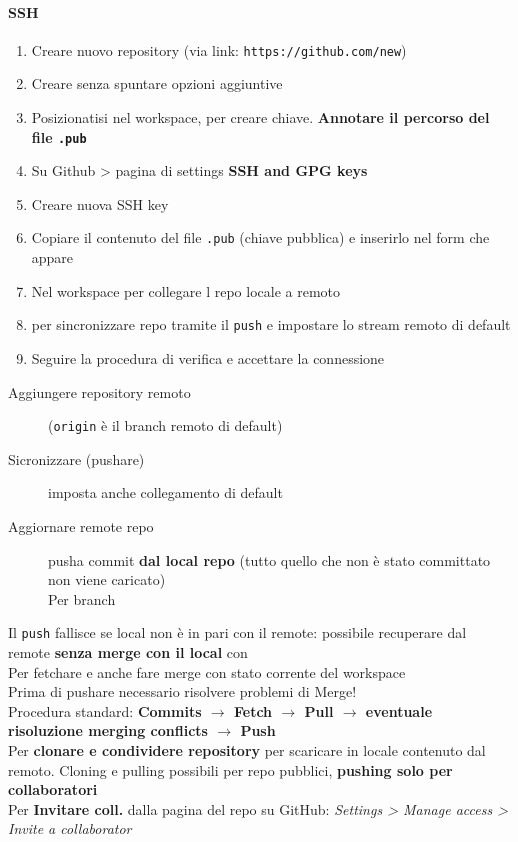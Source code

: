 \documentclass[10pt, oneside]{Book}
\begin{document}
\paragraph{SSH} 
\begin{enumerate}
\item Creare nuovo repository (via link: \texttt{https://github.com/new}) 
\item Creare senza spuntare opzioni aggiuntive
\item Posizionatisi nel workspace,  per creare chiave. \textbf{Annotare il percorso del file \texttt{.pub}}
\item Su Github > pagina di settings \textbf{SSH and GPG keys}
\item Creare nuova SSH key
\item Copiare il contenuto del file \texttt{.pub} (chiave pubblica) e inserirlo nel form che appare
\item Nel workspace  per collegare l repo locale a remoto
\item {} per sincronizzare repo tramite il \texttt{push} e impostare lo stream remoto di default
\item Seguire la procedura di verifica e accettare la connessione
\end{enumerate}

\begin{description}
\item[Aggiungere repository remoto]  (\texttt{origin} è il branch remoto di default)
\item[Sicronizzare (pushare)]  imposta anche collegamento di default
\item[Aggiornare remote repo]  pusha commit \textbf{dal local repo} (tutto quello che non è stato committato non viene caricato)
\\Per branch 
\end{description}
Il \texttt{push} fallisce se local non è in pari con il remote: possibile recuperare dal remote \textbf{senza merge con il local} con 
\\ Per fetchare e anche fare merge con stato corrente del workspace
\\Prima di pushare necessario risolvere problemi di Merge!
\\Procedura standard: \textbf{Commits $\rightarrow$ Fetch $\rightarrow$ Pull $\rightarrow$ eventuale risoluzione merging conflicts $\rightarrow$ Push}
\\Per \textbf{clonare e condividere repository}  per scaricare in locale contenuto dal remoto. Cloning e pulling possibili per repo pubblici, \textbf{pushing solo per collaboratori}
\\Per \textbf{Invitare coll.} dalla pagina del repo su GitHub: \textit{Settings > Manage access > Invite a collaborator}
\end{document}
